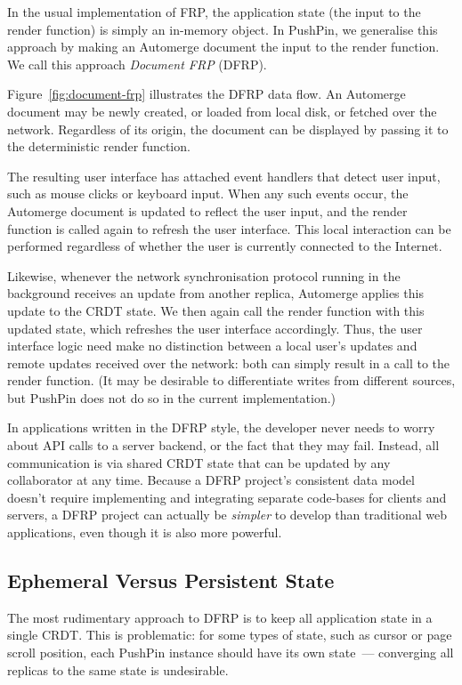 \documentclass[sigplan,10pt]{acmart}
\begin{document}
In the usual implementation of FRP, the application state (the input to the render function) is simply an in-memory object.
In PushPin, we generalise this approach by making an Automerge document the input to the render function.
We call this approach \emph{Document FRP} (DFRP).

Figure~\ref{fig:document-frp} illustrates the DFRP data flow.
An Automerge document may be newly created, or loaded from local disk, or fetched over the network.
Regardless of its origin, the document can be displayed by passing it to the deterministic render function.

The resulting user interface has attached event handlers that detect user input, such as mouse clicks or keyboard input.
When any such events occur, the Automerge document is updated to reflect the user input, and the render function is called again to refresh the user interface.
This local interaction can be performed regardless of whether the user is currently connected to the Internet.

Likewise, whenever the network synchronisation protocol running in the background receives an update from another replica, Automerge applies this update to the CRDT state.
We then again call the render function with this updated state, which refreshes the user interface accordingly. Thus, the user interface logic need make no distinction between a local user's updates and remote updates received over the network: both can simply result in a call to the render function. (It may be desirable to differentiate writes from different sources, but PushPin does not do so in the current implementation.)

In applications written in the DFRP style, the developer never needs to worry about API calls to a server backend, or the fact that they may fail. Instead, all communication is via shared CRDT state that can be updated by any collaborator at any time. Because a DFRP project's consistent data model doesn't require implementing and integrating separate code-bases for clients and servers, a DFRP project can actually be \emph{simpler} to develop than traditional web applications, even though it is also more powerful.

\subsection{Ephemeral Versus Persistent State}

The most rudimentary approach to DFRP is to keep all application state in a single CRDT. This is problematic: for some types of state, such as cursor or page scroll position, each PushPin instance should have its own state~--- converging all replicas to the same state is undesirable.
\end{document}
